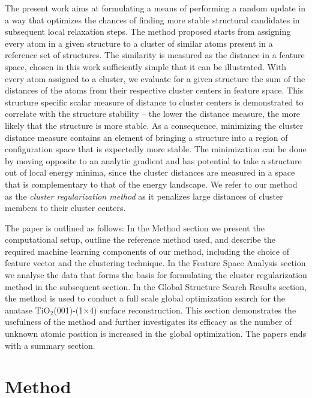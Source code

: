 \documentclass[aip,amsmath,amssymb,reprint]{revtex4-1}
\begin{document}
The present work aims at formulating a means of performing a random
update in a way that optimizes the chances of finding more stable
structural candidates in subsequent local relaxation steps. The method
proposed starts from assigning every atom in a given structure to a
cluster of similar atoms present in a reference set of structures.
The similarity is measured as the distance in a feature space, chosen in this work
sufficiently simple that it can be illustrated. With every atom
assigned to a cluster, we evaluate for a given structure the sum of
the distances of the atoms from their respective
cluster centers in feature space. This structure specific scalar measure of distance to
cluster centers is demonstrated to correlate with the structure
stability -- the lower the distance measure, the more likely that the
structure is more stable. As a consequence, minimizing the cluster distance measure
contains an element of bringing a structure into a region of
configuration space that is expectedly more stable. The minimization
can be done by moving opposite to an analytic gradient and has
potential to take a structure out of local energy minima, since the
cluster distances are measured in a space that is complementary to that of the
energy landscape. We refer to our method as the
\textit{cluster regularization method} as it penalizes large
distances of cluster members to their cluster centers.

The paper is outlined as follows: In the Method section we present
the computational setup, outline the reference method used, and
describe the required machine learning components of our method,
including the choice of feature vector and the clustering technique.
In the Feature Space Analysis section we analyse the data that forms the basis for formulating the cluster
regularization method in the subsequent section. In the Global Structure Search Results
section, the method is used to conduct a full scale global optimization 
search for the anatase TiO$_2$(001)-(1$\times$4) surface
reconstruction.\cite{anatase2} This section demonstrates the usefulness of the method
and further investigates its efficacy as the number of unknown atomic
position is increased in the global optimization. The papers ends with a summary section.

\section{Method}
\end{document}
